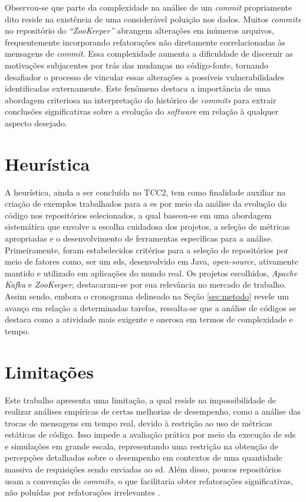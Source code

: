 
Observou-se que parte da complexidade na análise de um \textit{commit} propriamente dito reside na existência de uma considerável poluição nos dados. Muitos \textit{commits} no repositório do \textit{``ZooKeeper''} abrangem alterações em inúmeros arquivos, frequentemente incorporando refatorações não diretamente correlacionadas às mensagens de \textit{commit}. Essa complexidade aumenta a dificuldade de discernir as motivações subjacentes por trás das mudanças no código-fonte, tornando desafiador o processo de vincular essas alterações a possíveis vulnerabilidades identificadas externamente. Este fenômeno destaca a importância de uma abordagem criteriosa na interpretação do histórico de \textit{commits} para extrair conclusões significativas sobre a evolução do \textit{software} em relação à qualquer aspecto desejado.

\section{Heurística}
\label{sec:heuristica}

A heurística, ainda a ser concluída no TCC2, tem como finalidade auxiliar na criação de exemplos trabalhados para a \gls{es} por meio da análise da evolução do código nos repositórios selecionados, a qual baseou-se em uma abordagem sistemática que envolve a escolha cuidadosa dos projetos, a seleção de métricas apropriadas e o desenvolvimento de ferramentas específicas para a análise. Primeiramente, foram estabelecidos critérios para a seleção de repositórios por meio de fatores como, ser um \gls{sds}, desenvolvido em Java, \textit{open-source}, ativamente mantido e utilizado em aplicações do mundo real. Os projetos escolhidos, \textit{Apache Kafka} e \textit{ZooKeeper}, destacaram-se por sua relevância no mercado de trabalho. Assim sendo, embora o cronograma delineado na Seção \ref{sec:metodo} revele um avanço em relação a determinadas tarefas, ressalta-se que a análise de códigos se destaca como a atividade mais exigente e onerosa em termos de complexidade e tempo.

\section{Limitações}
\label{sec:limitacoes}

Este trabalho apresenta uma limitação, a qual reside na impossibilidade de realizar análises empíricas de certas melhorias de desempenho, como a análise das trocas de mensagens em tempo real, devido à restrição ao uso de métricas estáticas de código. Isso impede a avaliação prática por meio da execução de \gls{sds} e simulações em grande escala, representando uma restrição na obtenção de percepções detalhadas sobre o desempenho em contextos de uma quantidade massiva de requisições sendo enviadas ao \gls{sd}. Além disso, poucos repositórios usam a convenção de \textit{commits}, o que facilitaria obter refatorações significativas, não poluídas por refatorações irrelevantes \cite{conventionalcommits}.
